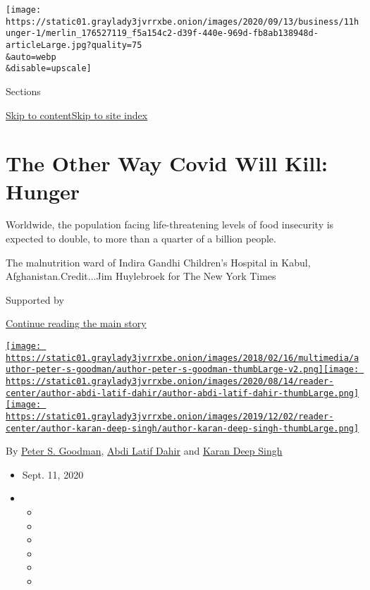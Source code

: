\texttt{[image: https://static01.graylady3jvrrxbe.onion/images/2020/09/13/business/11hunger-1/merlin\_176527119\_f5a154c2-d39f-440e-969d-fb8ab138948d-articleLarge.jpg?quality=75\\\&auto=webp\\\&disable=upscale]}

Sections

\protect\hyperlink{site-content}{Skip to
content}\protect\hyperlink{site-index}{Skip to site index}

\hypertarget{the-other-way-covid-will-kill-hunger}{%
\section{The Other Way Covid Will Kill:
Hunger}\label{the-other-way-covid-will-kill-hunger}}

Worldwide, the population facing life-threatening levels of food
insecurity is expected to double, to more than a quarter of a billion
people.

The malnutrition ward of Indira Gandhi Children's Hospital in Kabul,
Afghanistan.Credit...Jim Huylebroek for The New York Times

Supported by

\protect\hyperlink{after-sponsor}{Continue reading the main story}

\href{https://www.nytimes3xbfgragh.onion/by/peter-s-goodman}{\texttt{[image: https://static01.graylady3jvrrxbe.onion/images/2018/02/16/multimedia/author-peter-s-goodman/author-peter-s-goodman-thumbLarge-v2.png]}}\href{https://www.nytimes3xbfgragh.onion/by/abdi-latif-dahir}{\texttt{[image: https://static01.graylady3jvrrxbe.onion/images/2020/08/14/reader-center/author-abdi-latif-dahir/author-abdi-latif-dahir-thumbLarge.png]}}\href{https://www.nytimes3xbfgragh.onion/by/karan-deep-singh}{\texttt{[image: https://static01.graylady3jvrrxbe.onion/images/2019/12/02/reader-center/author-karan-deep-singh/author-karan-deep-singh-thumbLarge.png]}}

By \href{https://www.nytimes3xbfgragh.onion/by/peter-s-goodman}{Peter S.
Goodman},
\href{https://www.nytimes3xbfgragh.onion/by/abdi-latif-dahir}{Abdi Latif
Dahir} and
\href{https://www.nytimes3xbfgragh.onion/by/karan-deep-singh}{Karan Deep
Singh}

\begin{itemize}
\item
  Sept. 11, 2020
\item
  \begin{itemize}
  \item
  \item
  \item
  \item
  \item
  \item
  \end{itemize}
\end{itemize}

